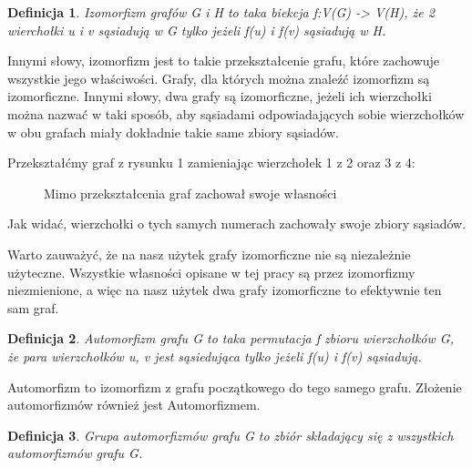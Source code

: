 \documentclass[11pt]{article}
\newtheorem{definition}{Definicja}[section]
\begin{document}
  \begin{definition}
    Izomorfizm grafów G i H to taka biekcja f:V(G) -> V(H), że 2 wierchołki u i v sąsiadują w G tylko jeżeli f(u) i f(v) sąsiadują w H.
  \end{definition}

  Innymi słowy, izomorfizm jest to takie przekształcenie grafu, które zachowuje wszystkie jego właściwości. Grafy, dla których można znaleźć izomorfizm są izomorficzne. Innymi słowy, dwa grafy są izomorficzne, jeżeli ich wierzchołki można nazwać w taki sposób, 
  aby sąsiadami odpowiadających sobie wierzchołków w obu grafach miały dokładnie takie same zbiory sąsiadów.
  

  Przekształćmy graf z rysunku 1 zamieniając wierzchołek 1 z 2 oraz 3 z 4:
  \begin{figure}[H]
    \centering
    \caption{Mimo przekształcenia graf zachował swoje własności}
  \end{figure}

  Jak widać, wierzchołki o tych samych numerach zachowały swoje zbiory sąsiadów. 

  Warto zauważyć, że na nasz użytek grafy izomorficzne nie są niezależnie użyteczne. Wszystkie własności opisane w tej pracy są przez izomorfizmy niezmienione, a więc na nasz użytek dwa grafy izomorficzne to efektywnie ten sam graf.


  \begin{definition}
    Automorfizm grafu G to taka permutacja f zbioru wierzchołków G, że para wierzchołków u, v jest sąsiedująca tylko jeżeli f(u) i f(v) sąsiadują. 
  \end{definition}
  Automorfizm to izomorfizm z grafu początkowego do tego samego grafu. 
  Złożenie automorfizmów również jest Automorfizmem.  

  \begin{definition}
    Grupa automorfizmów grafu G to zbiór składający się z wszystkich automorfizmów grafu G.
  \end{definition}
\end{document}
